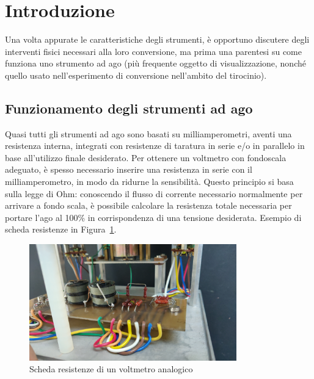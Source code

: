 \documentclass[12pt,a4paper]{report}
\begin{document}



\section{Introduzione}
Una volta appurate le caratteristiche degli strumenti, è opportuno discutere degli interventi fisici necessari alla loro conversione,
ma prima una parentesi su come funziona uno strumento ad ago (più frequente oggetto di visualizzazione, nonché quello
usato nell'esperimento di conversione nell'ambito del tirocinio).

\subsection*{Funzionamento degli strumenti ad ago}
Quasi tutti gli strumenti ad ago sono basati su milliamperometri, aventi una resistenza interna, integrati con resistenze di taratura
in serie e/o in parallelo in base all'utilizzo finale desiderato. Per ottenere un voltmetro con fondoscala adeguato, è spesso necessario
inserire una resistenza in serie con il milliamperometro, in modo da ridurne la sensibilità.
Questo principio si basa sulla legge di Ohm: conoscendo il flusso di corrente necessario normalmente per arrivare a fondo scala, è
possibile calcolare la resistenza totale necessaria per portare l'ago al 100\% in corrispondenza di una tensione desiderata.
Esempio di scheda resistenze in Figura~\ref{fig:schedaresistenze}.

\begin{figure}[h]
  \centering
  \includegraphics[width=0.8\textwidth]{schedaresistenze}
  \caption{Scheda resistenze di un voltmetro analogico}
  \label{fig:schedaresistenze}
\end{figure}
\end{document}
